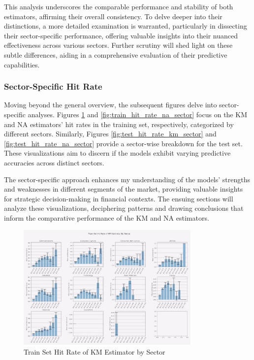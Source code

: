 This analysis underscores the comparable performance and stability of both estimators, affirming their overall consistency. To delve deeper into their distinctions, a more detailed examination is warranted, particularly in dissecting their sector-specific performance, offering valuable insights into their nuanced effectiveness across various sectors. Further scrutiny will shed light on these subtle differences, aiding in a comprehensive evaluation of their predictive capabilities.

\subsubsection{Sector-Specific Hit Rate}
Moving beyond the general overview, the subsequent figures delve into sector-specific analyses. Figures \ref{fig:train_hit_rate_km_sector} and \ref{fig:train_hit_rate_na_sector} focus on the KM and NA estimators' hit rates in the training set, respectively, categorized by different sectors. Similarly, Figures \ref{fig:test_hit_rate_km_sector} and \ref{fig:test_hit_rate_na_sector} provide a sector-wise breakdown for the test set. These visualizations aim to discern if the models exhibit varying predictive accuracies across distinct sectors.

The sector-specific approach enhances my understanding of the models' strengths and weaknesses in different segments of the market, providing valuable insights for strategic decision-making in financial contexts. The ensuing sections will analyze these visualizations, deciphering patterns and drawing conclusions that inform the comparative performance of the KM and NA estimators.

\begin{figure}[H]
    \centering
    \includegraphics[width=0.8\textwidth]{figures/jpm/14. Train Set Hit Rate of KM Estimator By Sector.png}
    \caption{Train Set Hit Rate of KM Estimator by Sector}
    \label{fig:train_hit_rate_km_sector}
\end{figure}

